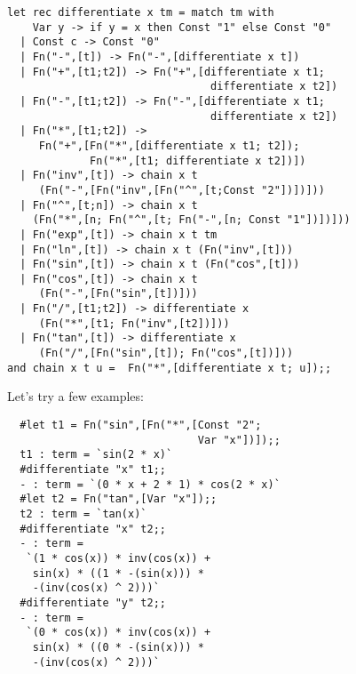 \begin{slide*}


\begin{black}\begin{footnotesize}\begin{verbatim}
let rec differentiate x tm = match tm with
    Var y -> if y = x then Const "1" else Const "0"
  | Const c -> Const "0"
  | Fn("-",[t]) -> Fn("-",[differentiate x t])
  | Fn("+",[t1;t2]) -> Fn("+",[differentiate x t1;
                                differentiate x t2])
  | Fn("-",[t1;t2]) -> Fn("-",[differentiate x t1;
                                differentiate x t2])
  | Fn("*",[t1;t2]) ->
     Fn("+",[Fn("*",[differentiate x t1; t2]);
             Fn("*",[t1; differentiate x t2])])
  | Fn("inv",[t]) -> chain x t
     (Fn("-",[Fn("inv",[Fn("^",[t;Const "2"])])]))
  | Fn("^",[t;n]) -> chain x t
    (Fn("*",[n; Fn("^",[t; Fn("-",[n; Const "1"])])]))
  | Fn("exp",[t]) -> chain x t tm
  | Fn("ln",[t]) -> chain x t (Fn("inv",[t]))
  | Fn("sin",[t]) -> chain x t (Fn("cos",[t]))
  | Fn("cos",[t]) -> chain x t
     (Fn("-",[Fn("sin",[t])]))
  | Fn("/",[t1;t2]) -> differentiate x
     (Fn("*",[t1; Fn("inv",[t2])]))
  | Fn("tan",[t]) -> differentiate x
     (Fn("/",[Fn("sin",[t]); Fn("cos",[t])]))
and chain x t u =  Fn("*",[differentiate x t; u]);;
\end{verbatim}\end{footnotesize}\end{black}


\end{slide*}




\begin{slide*}


\vspace*{0.2cm}

Let's try a few examples:

\begin{black}\begin{verbatim}
  #let t1 = Fn("sin",[Fn("*",[Const "2";
                              Var "x"])]);;
  t1 : term = `sin(2 * x)`
  #differentiate "x" t1;;
  - : term = `(0 * x + 2 * 1) * cos(2 * x)`
  #let t2 = Fn("tan",[Var "x"]);;
  t2 : term = `tan(x)`
  #differentiate "x" t2;;
  - : term =
   `(1 * cos(x)) * inv(cos(x)) +
    sin(x) * ((1 * -(sin(x))) *
    -(inv(cos(x) ^ 2)))`
  #differentiate "y" t2;;
  - : term =
   `(0 * cos(x)) * inv(cos(x)) +
    sin(x) * ((0 * -(sin(x))) *
    -(inv(cos(x) ^ 2)))`
\end{verbatim}\end{black}

\end{slide*}


